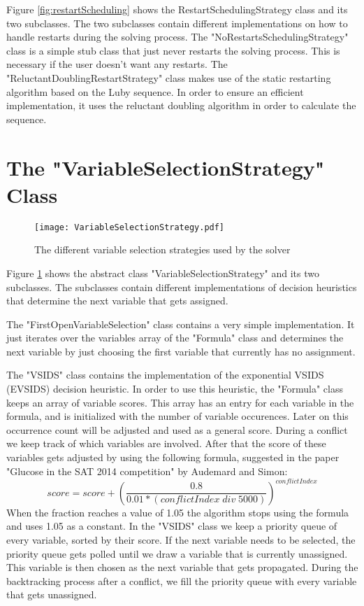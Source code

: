 Figure \ref{fig:restartScheduling} shows the RestartSchedulingStrategy class and its two subclasses. The two subclasses contain different implementations on how to handle restarts during the solving process. The "NoRestartsSchedulingStrategy" class is a simple stub class that just never restarts the solving process. This is necessary if the user doesn't want any restarts. The "ReluctantDoublingRestartStrategy" class makes use of the static restarting algorithm based on the Luby sequence. In order to ensure an efficient implementation, it uses the reluctant doubling algorithm in order to calculate the sequence.

\section{The "VariableSelectionStrategy" Class}

\begin{figure}[htbp]
  \centering
  \texttt{[image: VariableSelectionStrategy.pdf]}
  \caption{The different variable selection strategies used by the solver}
  \label{fig:variableSelection}
\end{figure}

Figure \ref{fig:variableSelection} shows the abstract class "VariableSelectionStrategy" and its two subclasses. The subclasses contain different implementations of decision heuristics that determine the next variable that gets assigned.

The "FirstOpenVariableSelection" class contains a very simple implementation. It just iterates over the variables array of the "Formula" class and determines the next variable by just choosing the first variable that currently has no assignment.

The "VSIDS" class contains the implementation of the exponential VSIDS (EVSIDS) decision heuristic. In order to use this heuristic, the "Formula" class keeps an array of variable scores. This array has an entry for each variable in the formula, and is initialized with the number of variable occurences. Later on this occurrence count will be adjusted and used as a general score. During a conflict we keep track of which variables are involved. After that the score of these variables gets adjusted by using the following formula, suggested in the paper "Glucose in the SAT 2014 competition" \cite{audemard2014glucose} by Audemard and Simon:
\begin{displaymath}
score = score + (\frac{0.8}{0.01 * (conflictIndex \; div \; 5000)})^{conflictIndex}
\end{displaymath}
When the fraction reaches a value of 1.05 the algorithm stops using the formula and uses 1.05 as a constant.
In the "VSIDS" class we keep a priority queue of every variable, sorted by their score. If the next variable needs to be selected, the priority queue gets polled until we draw a variable that is currently unassigned. This variable is then chosen as the next variable that gets propagated. During the backtracking process after a conflict, we fill the priority queue with every variable that gets unassigned.

